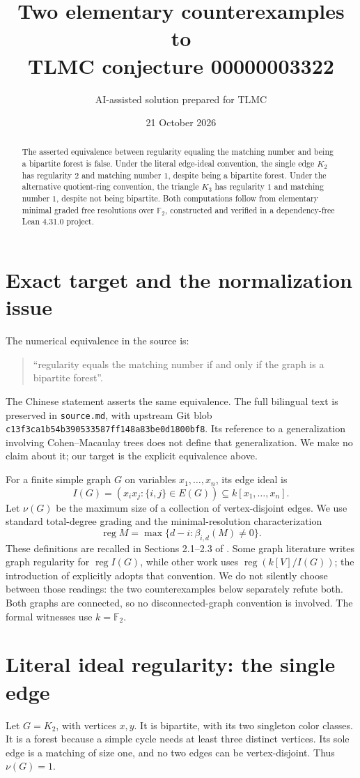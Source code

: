 \documentclass[11pt]{article}
\title{Two elementary counterexamples to\\TLMC conjecture 00000003322}
\author{AI-assisted solution prepared for TLMC}
\date{21 October 2026}
\newcommand{\F}{\mathbb F_2}
\newcommand{\reg}{\operatorname{reg}}
\begin{document}
\maketitle
\begin{abstract}
The asserted equivalence between regularity equaling the matching number and being a bipartite forest is false. Under the literal edge-ideal convention, the single edge $K_2$ has regularity $2$ and matching number $1$, despite being a bipartite forest. Under the alternative quotient-ring convention, the triangle $K_3$ has regularity $1$ and matching number $1$, despite not being bipartite. Both computations follow from elementary minimal graded free resolutions over $\F$, constructed and verified in a dependency-free Lean 4.31.0 project.
\end{abstract}

\section{Exact target and the normalization issue}
The numerical equivalence in the source is:
\begin{quote}
``regularity equals the matching number if and only if the graph is a bipartite forest''.
\end{quote}
The Chinese statement asserts the same equivalence. The full bilingual text is preserved in \texttt{source.md}, with upstream Git blob
\texttt{c13f3ca1b54b390533587ff148a83be0d1800bf8}. Its reference to a generalization involving Cohen--Macaulay trees does not define that generalization. We make no claim about it; our target is the explicit equivalence above.

For a finite simple graph $G$ on variables $x_1,\ldots,x_n$, its edge ideal is
\[
 I(G)=(x_ix_j:\{i,j\}\in E(G))\subseteq k[x_1,\ldots,x_n].
\]
Let $\nu(G)$ be the maximum size of a collection of vertex-disjoint edges. We use standard total-degree grading and the minimal-resolution characterization
\[
 \reg M=\max\{d-i:\beta_{i,d}(M)\ne0\}.
\]
These definitions are recalled in Sections 2.1--2.3 of \cite{survey}. Some graph literature writes graph regularity for $\reg I(G)$, while other work uses $\reg(k[V]/I(G))$; the introduction of \cite{quotient} explicitly adopts that convention. We do not silently choose between those readings: the two counterexamples below separately refute both. Both graphs are connected, so no disconnected-graph convention is involved. The formal witnesses use $k=\F$.

\section{Literal ideal regularity: the single edge}
Let $G=K_2$, with vertices $x,y$. It is bipartite, with its two singleton color classes. It is a forest because a simple cycle needs at least three distinct vertices. Its sole edge is a matching of size one, and no two edges can be vertex-disjoint. Thus $\nu(G)=1$.
\end{document}
